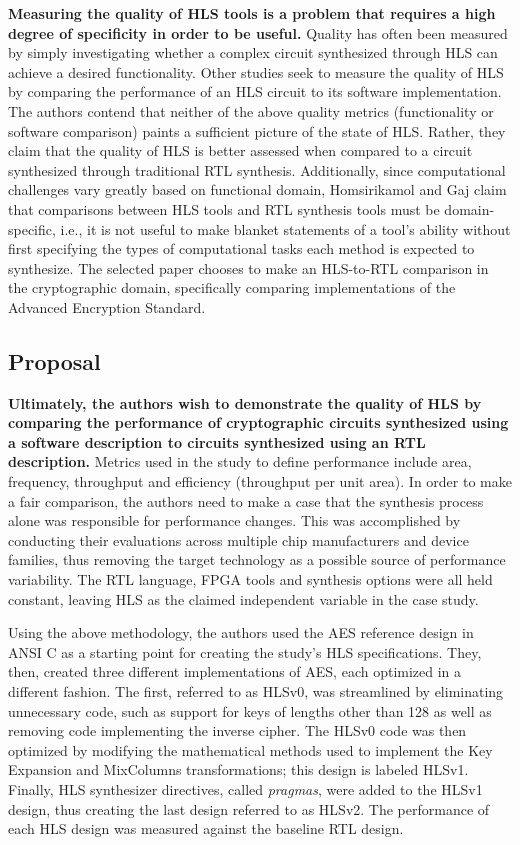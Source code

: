 \documentclass[12pt,journal,compsoc,onecolumn]{IEEEtran}
\begin{document}
\textbf{Measuring the quality of HLS tools is a problem that requires a high degree of specificity in order to be useful.} Quality has often been measured by simply investigating whether a complex circuit synthesized through HLS can achieve a desired functionality\cite{8}\cite{9}\cite{10}\cite{11}\cite{12}. Other studies \cite{3}\cite{4} seek to measure the quality of HLS by comparing the performance of an HLS circuit to its software implementation. The authors contend that neither of the above quality metrics (functionality or software comparison) paints a sufficient picture of the state of HLS. Rather, they claim that the quality of HLS is better assessed when compared to a circuit synthesized through traditional RTL synthesis. Additionally, since computational challenges vary greatly based on functional domain, Homsirikamol and Gaj claim that comparisons between HLS tools and RTL synthesis tools must be domain-specific, i.e., it is not useful to make blanket statements of a tool's ability without first specifying the types of computational tasks each method is expected to synthesize. The selected paper chooses to make an HLS-to-RTL comparison in the cryptographic domain, specifically comparing implementations of the Advanced Encryption Standard.

\subsection{Proposal}

\textbf{Ultimately, the authors wish to demonstrate the quality of HLS by comparing the performance of cryptographic circuits synthesized using a software description to circuits synthesized using an RTL description.} Metrics used in the study to define performance include area, frequency, throughput and efficiency (throughput per unit area). In order to make a fair comparison, the authors need to make a case that the synthesis process alone was responsible for performance changes. This was accomplished by conducting their evaluations across multiple chip manufacturers and device families, thus removing the target technology as a possible source of performance variability. The RTL language, FPGA tools and synthesis options were all held constant, leaving HLS as the claimed independent variable in the case study. 

Using the above methodology, the authors used the AES reference design in ANSI C \cite{17} as a starting point for creating the study's HLS specifications. They, then, created three different implementations of AES, each optimized in a different fashion. The first, referred to as HLSv0, was streamlined by eliminating unnecessary code, such as support for keys of lengths other than 128 as well as removing code implementing the inverse cipher. The HLSv0 code was then optimized by modifying the mathematical methods used to implement the Key Expansion and MixColumns transformations; this design is labeled HLSv1. Finally, HLS synthesizer directives, called \emph{pragmas}, were added to the HLSv1 design, thus creating the last design referred to as HLSv2. The performance of each HLS design was measured against the baseline RTL design.
\end{document}
